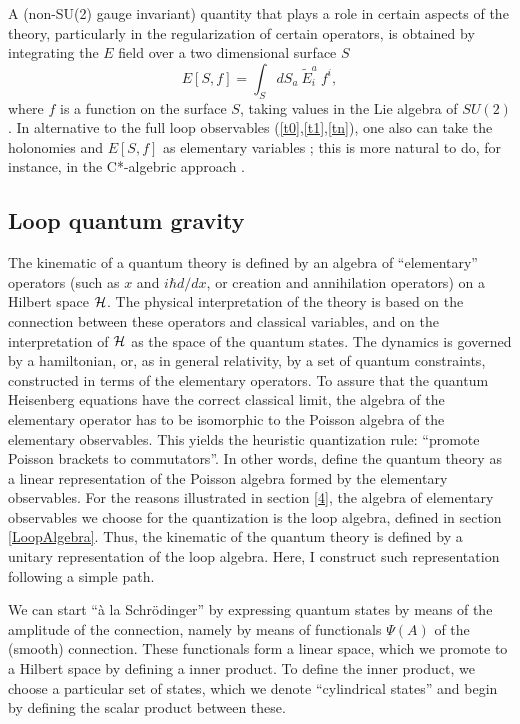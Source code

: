\documentclass[12pt]{article}
\begin{document}
A (non-SU(2) gauge invariant) quantity that plays a role in 
certain aspects of the theory, particularly in the regularization 
of certain operators, is obtained by integrating the $E$ field 
over a two dimensional surface $S$ 
\begin{equation}
	E[S,f] = \int_{S} dS_{a}\ \tilde{E}^{a}_{i}\ f^{i}, 
\end{equation}
where $f$ is a function on the surface $S$, taking values in the 
Lie algebra of $SU(2)$.  In alternative to the full loop 
observables (\ref{t0},\ref{t1},\ref{tn}), one also can take the 
holonomies and $E[S,f]$ as elementary variables 
\cite{AshtekarLewandowski3,AshtekarLewandowskiArea2}; this is 
more natural to do, for instance, in the C*-algebric approach 
\cite{AshtekarIsham}.

\subsection{Loop quantum gravity} \label{hilbertspace}

The kinematic of a quantum theory is defined by an algebra of 
``elementary'' operators (such as $x$ and $i\hbar d/dx$, or 
creation and annihilation operators) on a Hilbert space $\cal H$.  
The physical interpretation of the theory is based on the 
connection between these operators and classical variables, and 
on the interpretation of $\cal H$ as the space of the quantum 
states.  The dynamics is governed by a hamiltonian, or, as in 
general relativity, by a set of quantum constraints, constructed 
in terms of the elementary operators.  To assure that the quantum 
Heisenberg equations have the correct classical limit, the 
algebra of the elementary operator has to be isomorphic to the 
Poisson algebra of the elementary observables.  This yields the 
heuristic quantization rule: ``promote Poisson brackets to 
commutators''.  In other words, define the quantum theory as a 
linear representation of the Poisson algebra formed by the 
elementary observables.  For the reasons illustrated in section 
\ref{4}, the algebra of elementary observables we choose for the 
quantization is the loop algebra, defined in section 
\ref{LoopAlgebra}.  Thus, the kinematic of the quantum theory is 
defined by a unitary representation of the loop algebra.  Here, I 
construct such representation following a simple path.

We can start ``\`{a} la Schr\"odinger'' by expressing quantum 
states by means of the amplitude of the connection, namely by 
means of functionals $\Psi(A)$ of the (smooth) connection.  These 
functionals form a linear space, which we promote to a Hilbert 
space by defining a inner product.  To define the inner product, 
we choose a particular set of states, which we denote 
``cylindrical states'' and begin by defining the 
scalar product between these.   
\end{document}
